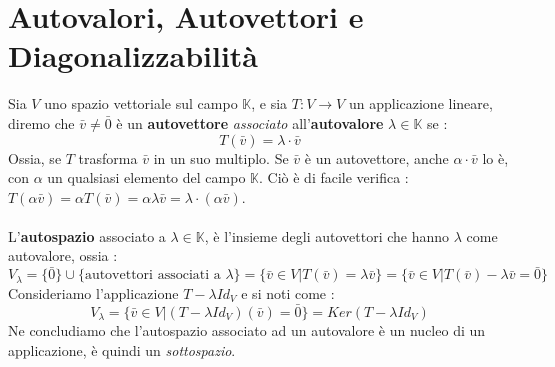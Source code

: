 \documentclass[12pt, letterpaper]{article}
\newcommand{\ve}{{\bar v}}
\newcommand{\acc}{\\\hphantom{}\\}
\begin{document}
\section{Autovalori, Autovettori e Diagonalizzabilità}
Sia \(V\) uno spazio vettoriale sul campo \(\mathbb{K}\), e sia \(T:V\rightarrow V\) un applicazione lineare, 
diremo che \(\ve\ne \bar 0\) è un \textbf{autovettore} \textit{associato} all'\textbf{autovalore} \(\lambda\in \mathbb{K}\) se : 
$$T(\bar v)= \lambda \cdot \ve$$
Ossia, se \(T\) trasforma \(\bar v\) in un suo multiplo. Se \(\bar v\) è un autovettore, anche \(\alpha\cdot \ve\) lo è, 
con \(\alpha\) un qualsiasi elemento del campo \(\mathbb{K}\). Ciò è di facile verifica :
\(T(\alpha \bar v)=\alpha T(\ve)=\alpha \lambda \ve = \lambda \cdot (\alpha \ve)\).\acc 
L'\textbf{autospazio} associato a \(\lambda\in \mathbb{K}\), è l'insieme degli autovettori che hanno \(\lambda\) come 
autovalore, ossia : $$V_\lambda = \{\bar 0\}\cup \{\text{autovettori associati a }\lambda\}=\{\bar v\in V|T(\ve)=\lambda\ve\}
=\{\ve\in V|T(\bar v)-\lambda \ve=\bar 0\}$$
Consideriamo l'applicazione \(T-\lambda Id_V\) e si noti come :$$ V_\lambda  =
\{\ve \in V |(T-\lambda Id_V)(\ve)=\bar 0\}=Ker(T-\lambda Id_V)$$
Ne concludiamo che l'autospazio associato ad un autovalore è un nucleo di un applicazione, è quindi un \textit{sottospazio}.
\end{document}
